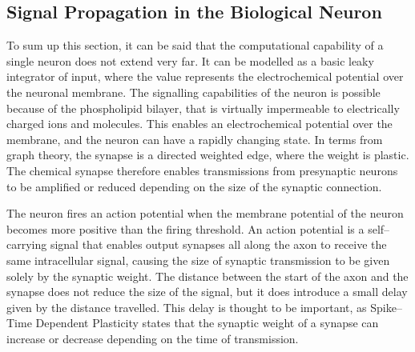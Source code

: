 	\subsection{Signal Propagation in the Biological Neuron}
		To sum up this section, it can be said that the computational capability of a single neuron does not extend very far.
		It can be modelled as a basic leaky integrator of input, where the value represents the electrochemical potential over the neuronal membrane.
		The signalling capabilities of the neuron is possible because of the phospholipid bilayer, that is virtually impermeable to electrically charged ions and molecules.
		This enables an electrochemical potential over the membrane, and the neuron can have a rapidly changing state.
		In terms from graph theory, the synapse is a directed weighted edge, where the weight is plastic.
		The chemical synapse therefore enables transmissions from presynaptic neurons to be amplified or reduced depending on the size of the synaptic connection.

		The neuron fires an action potential when the membrane potential of the neuron becomes more positive than the firing threshold.
		An action potential is a self--carrying signal that enables output synapses all along the axon to receive the same intracellular signal, causing the size of synaptic transmission to be given solely by the synaptic weight.
		The distance between the start of the axon and the synapse does not reduce the size of the signal, but it does introduce a small delay given by the distance travelled.
		This delay is thought to be important, as Spike--Time Dependent Plasticity states that the synaptic weight of a synapse can increase or decrease depending on the time of transmission.

